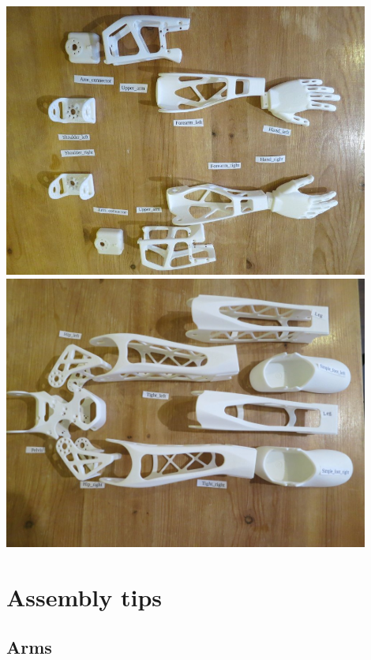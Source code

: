 \documentclass{article}
\begin{document}
\begin{center}
  \vspace{1mm}
  \includegraphics[width=0.9\textwidth]{img/parts_arms}\\
  \vspace{1mm}
  \includegraphics[width=0.9\textwidth]{img/parts_legs}
 \end{center}


\section{Assembly tips}
 \label{assembly-tips}




\subsection{Arms} 
 
\end{document}
